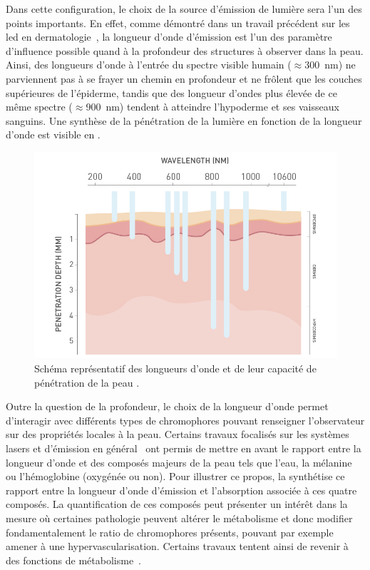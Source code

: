 Dans cette configuration, le choix de la source d'émission de lumière sera l'un des points importants. En effet, comme démontré dans un travail précédent sur les \gls{led} en dermatologie~\cite{Barolet2008}, la longueur d'onde d'émission est l'un des paramètre d'influence possible quand à la profondeur des structures à observer dans la peau. Ainsi, des longueurs d'onde à l'entrée du spectre visible humain ($\approx$\SI{300}{\nano\metre}) ne parviennent pas à se frayer un chemin en profondeur et ne frôlent que les couches supérieures de l'épiderme, tandis que des longueur d'ondes plus élevée de ce même spectre ($\approx$\SI{900}{\nano\metre}) tendent à atteindre l'hypoderme et ses vaisseaux sanguins. Une synthèse de la pénétration de la lumière en fonction de la longueur d'onde est visible en .\par

\begin{figure}[H]
    \centering
    \includegraphics[width=0.8\linewidth]{contents/chapter_2/resources/light_penatrating.png}
    \caption{Schéma représentatif des longueurs d’onde et de leur capacité de pénétration de la peau \cite{Barolet2008}.}
    \label{fig:light_penatrating}
\end{figure}\par

Outre la question de la profondeur, le choix de la longueur d'onde permet d'interagir avec différents types de chromophores pouvant renseigner l'observateur sur des propriétés locales à la peau. Certains travaux focalisés sur les systèmes lasers et d'émission en général~\cite{Stewart2013} ont permis de mettre en avant le rapport entre la longueur d'onde et des composés majeurs de la peau tels que l'eau, la mélanine ou l'hémoglobine (oxygénée ou non). Pour illustrer ce propos, la  synthétise ce rapport entre la longueur d'onde d'émission et l'absorption associée à ces quatre composés. La quantification de ces composés peut présenter un intérêt dans la mesure où certaines pathologie peuvent altérer le métabolisme et donc modifier fondamentalement le ratio de chromophores présents, pouvant par exemple amener à une hypervascularisation. Certains travaux tentent ainsi de revenir à des fonctions de métabolisme~\cite{Im2016}.\par

